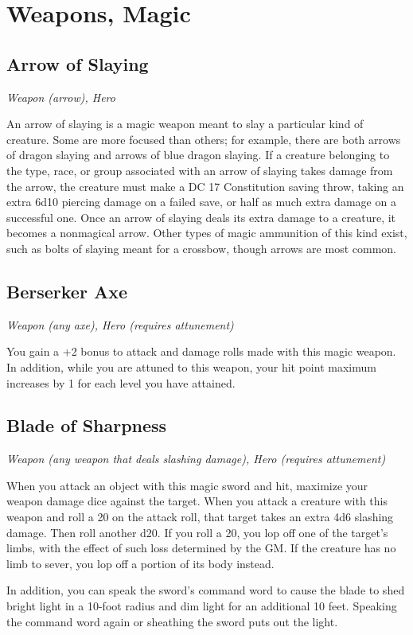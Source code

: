 \section{Weapons, Magic}\label{mi:weapons}

\subsection{Arrow of Slaying}
\textit{Weapon (arrow), Hero} 

An arrow of slaying is a magic weapon meant to slay a particular kind of creature. Some are more focused than others; for example, there are both arrows of dragon slaying and arrows of blue dragon slaying. If a creature belonging to the type, race, or group associated with an arrow of slaying takes damage from the arrow, the creature must make a DC 17 Constitution saving throw, taking an extra 6d10 piercing damage on a failed save, or half as much extra damage on a successful one.  Once an arrow of slaying deals its extra damage to a creature, it becomes a nonmagical arrow. Other types of magic ammunition of this kind exist, such as bolts of slaying meant for a crossbow, though arrows are most common.

\subsection{Berserker Axe}
\textit{Weapon (any axe), Hero (requires attunement)}

You gain a +2 bonus to attack and damage rolls made with this magic weapon. In addition, while you are attuned to this weapon, your hit point maximum increases by 1 for each level you have attained.

\subsection{Blade of Sharpness}
\textit{Weapon (any weapon that deals slashing damage), Hero (requires attunement)}

When you attack an object with this magic sword and hit, maximize your weapon damage dice against the target.
When you attack a creature with this weapon and roll a 20 on the attack roll, that target takes an extra 4d6 slashing damage. Then roll another d20. If you roll a 20, you lop off one of the target's limbs, with the effect of such loss determined by the GM. If the creature has no limb to sever, you lop off a portion of its body instead.

In addition, you can speak the sword's command word to cause the blade to shed bright light in a 10-foot radius and dim light for an additional 10 feet. Speaking the command word again or sheathing the sword puts out the light.


